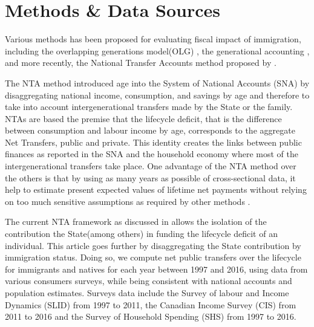   \section*{Methods \& Data Sources}\label{sec:data}

  Various methods has been proposed for evaluating fiscal impact of immigration, including the overlapping generations model(OLG) \citep{Akin:2012gh,Ileri:2019hf,Storesletten:2000cn}, the generational accounting \citep{Auerbach:2000wg,Preston:2014uw,Sokhna:2018ww}, and more recently, the National Transfer Accounts  method proposed by \citet{Mason:2011wc}.

  \vspace{0.7em}\par
  The NTA method introduced age into the System of National Accounts (SNA) by disaggregating national income, consumption, and savings by age and therefore to take into account intergenerational transfers made by the State or the family. NTAs are based the premise that the lifecycle deficit, that is the difference between consumption and labour income by age, corresponds to the aggregate Net Transfers, public and private. This identity creates the links between public finances as reported in the SNA and the household economy where most of the intergenerational transfers take place. One advantage of the NTA method over the others is that by using as many years as possible of cross-sectional data, it help to estimate present expected values of lifetime net payments without relying on too much sensitive assumptions as required by other methods \citep{dAlbis:2019de}.

  \vspace{0.7em}\par
  The current NTA framework as discussed in \citet{UnitedNations:2013vz}allows the isolation of the contribution the State(among others) in funding the lifecycle deficit of an individual. This article goes further by disaggregating the State contribution by immigration status. Doing so, we compute net public transfers over the lifecycle for immigrants and natives for each year between 1997 and 2016, using data from various consumers surveys, while being consistent with national accounts and population estimates. Surveys data include the Survey of labour and Income Dynamics (SLID) from 1997 to 2011, the Canadian Income Survey (CIS) from 2011 to 2016 and the Survey of Household Spending (SHS) from 1997 to 2016.

